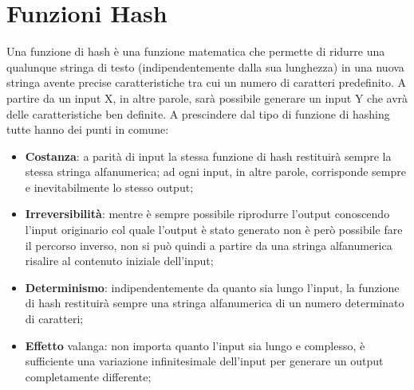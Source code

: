 \section{Funzioni Hash}

Una funzione di hash è una funzione matematica che permette di ridurre una
qualunque stringa di
testo (indipendentemente dalla sua lunghezza) in una nuova stringa avente
precise caratteristiche
tra cui un numero di caratteri predefinito. A partire da un input X, in
altre parole, sarà possibile
generare un input Y che avrà delle caratteristiche ben definite.
A prescindere dal tipo di funzione di hashing tutte hanno dei punti in comune:

\begin{itemize}
    \item \textbf{Costanza}: a parità di input la stessa funzione di hash
          restituirà sempre la stessa stringa
          alfanumerica; ad ogni input, in altre parole, corrisponde sempre e
          inevitabilmente lo stesso
          output;
    \item \textbf{Irreversibilità}: mentre è sempre possibile riprodurre
          l'output conoscendo l'input originario
          col quale l'output è stato generato non è però possibile fare
          il percorso inverso, non si può
          quindi a partire da una stringa alfanumerica risalire al contenuto
          iniziale dell'input;
    \item \textbf{Determinismo}: indipendentemente da quanto sia lungo l'input,
          la funzione di hash restituirà
          sempre una stringa alfanumerica di un numero determinato di caratteri;
    \item \textbf{Effetto} valanga: non importa quanto l'input sia lungo e
          complesso, è sufficiente una
          variazione infinitesimale dell'input per generare un output
          completamente differente;
\end{itemize}